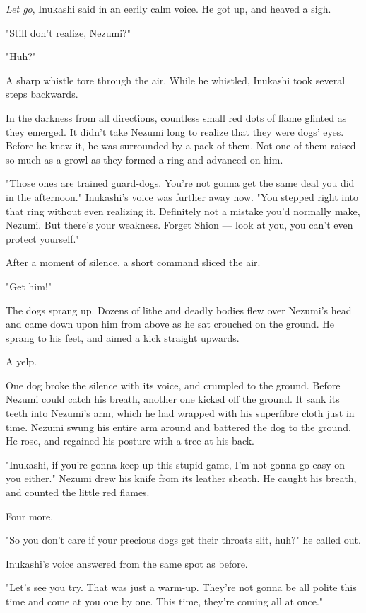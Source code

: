 \emph{Let go}, Inukashi said in an eerily calm voice. He got up, and heaved a
sigh.

"Still don't realize, Nezumi?"

"Huh?"

A sharp whistle tore through the air. While he whistled, Inukashi took
several steps backwards.

In the darkness from all directions, countless small red dots of flame
glinted as they emerged. It didn't take Nezumi long to realize that they
were dogs' eyes. Before he knew it, he was surrounded by a pack of them.
Not one of them raised so much as a growl as they formed a ring and
advanced on him.

"Those ones are trained guard-dogs. You're not gonna get the same deal
you did in the afternoon." Inukashi's voice was further away now. "You
stepped right into that ring without even realizing it. Definitely not a
mistake you'd normally make, Nezumi. But there's your weakness. Forget
Shion --- look at you, you can't even protect yourself."

After a moment of silence, a short command sliced the air.

"Get him!"

The dogs sprang up. Dozens of lithe and deadly bodies flew over Nezumi's
head and came down upon him from above as he sat crouched on the ground.
He sprang to his feet, and aimed a kick straight upwards.

A yelp.

One dog broke the silence with its voice, and crumpled to the ground.
Before Nezumi could catch his breath, another one kicked off the ground.
It sank its teeth into Nezumi's arm, which he had wrapped with his
superfibre cloth just in time. Nezumi swung his entire arm around and
battered the dog to the ground. He rose, and regained his posture with a
tree at his back.

"Inukashi, if you're gonna keep up this stupid game, I'm not gonna go
easy on you either." Nezumi drew his knife from its leather sheath. He
caught his breath, and counted the little red flames.

Four more.

"So you don't care if your precious dogs get their throats slit, huh?"
he called out.

Inukashi's voice answered from the same spot as before.

"Let's see you try. That was just a warm-up. They're not gonna be all
polite this time and come at you one by one. This time, they're coming
all at once."

